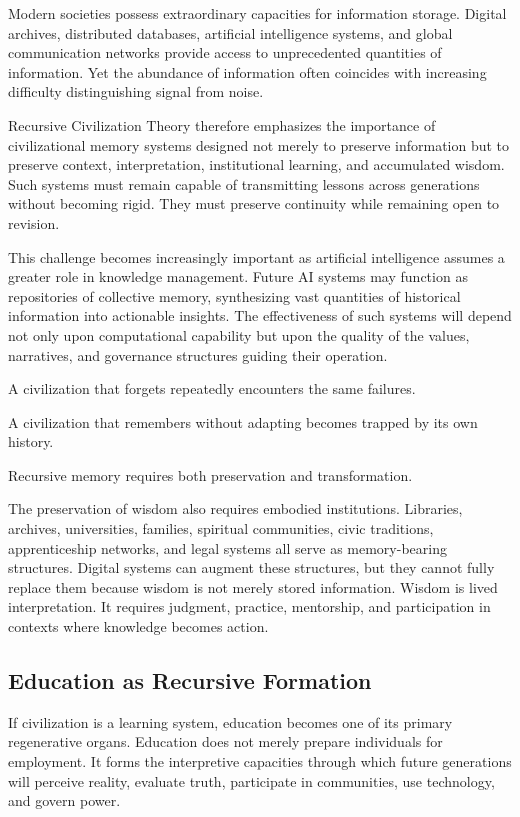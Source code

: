\documentclass[12pt]{article}
\begin{document}
Modern societies possess extraordinary capacities for information storage. Digital archives, distributed databases, artificial intelligence systems, and global communication networks provide access to unprecedented quantities of information. Yet the abundance of information often coincides with increasing difficulty distinguishing signal from noise.

Recursive Civilization Theory therefore emphasizes the importance of civilizational memory systems designed not merely to preserve information but to preserve context, interpretation, institutional learning, and accumulated wisdom. Such systems must remain capable of transmitting lessons across generations without becoming rigid. They must preserve continuity while remaining open to revision.

This challenge becomes increasingly important as artificial intelligence assumes a greater role in knowledge management. Future AI systems may function as repositories of collective memory, synthesizing vast quantities of historical information into actionable insights. The effectiveness of such systems will depend not only upon computational capability but upon the quality of the values, narratives, and governance structures guiding their operation.

A civilization that forgets repeatedly encounters the same failures.

A civilization that remembers without adapting becomes trapped by its own history.

Recursive memory requires both preservation and transformation.

The preservation of wisdom also requires embodied institutions. Libraries, archives, universities, families, spiritual communities, civic traditions, apprenticeship networks, and legal systems all serve as memory-bearing structures. Digital systems can augment these structures, but they cannot fully replace them because wisdom is not merely stored information. Wisdom is lived interpretation. It requires judgment, practice, mentorship, and participation in contexts where knowledge becomes action.

\subsection{Education as Recursive Formation}

If civilization is a learning system, education becomes one of its primary regenerative organs. Education does not merely prepare individuals for employment. It forms the interpretive capacities through which future generations will perceive reality, evaluate truth, participate in communities, use technology, and govern power.
\end{document}
